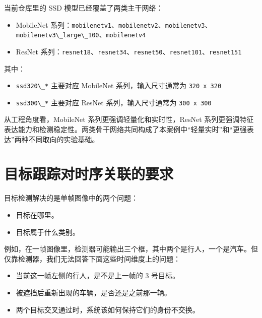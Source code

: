 当前仓库里的 SSD 模型已经覆盖了两类主干网络：

\begin{itemize}
\tightlist
\item
  MobileNet
  系列：\passthrough{\lstinline!mobilenetv1!}、\passthrough{\lstinline!mobilenetv2!}、\passthrough{\lstinline!mobilenetv3!}、\passthrough{\lstinline!mobilenetv3\_large\_100!}、\passthrough{\lstinline!mobilenetv4!}
\item
  ResNet
  系列：\passthrough{\lstinline!resnet18!}、\passthrough{\lstinline!resnet34!}、\passthrough{\lstinline!resnet50!}、\passthrough{\lstinline!resnet101!}、\passthrough{\lstinline!resnet151!}
\end{itemize}

其中：

\begin{itemize}
\tightlist
\item
  \passthrough{\lstinline!ssd320\_*!} 主要对应 MobileNet
  系列，输入尺寸通常为 \passthrough{\lstinline!320 x 320!}
\item
  \passthrough{\lstinline!ssd300\_*!} 主要对应 ResNet
  系列，输入尺寸通常为 \passthrough{\lstinline!300 x 300!}
\end{itemize}

从工程角度看，MobileNet 系列更强调轻量化和实时性，ResNet
系列更强调特征表达能力和检测稳定性。两类骨干网络共同构成了本案例中``轻量实时''和``更强表达''两种不同取向的实验基础。

\section{目标跟踪对时序关联的要求}\label{src-experiment-case2-h4}

目标检测解决的是单帧图像中的两个问题：

\begin{itemize}
\tightlist
\item
  目标在哪里。
\item
  目标属于什么类别。
\end{itemize}

例如，在一帧图像里，检测器可能输出三个框，其中两个是行人，一个是汽车。但仅靠检测器，我们无法回答下面这些时间维度上的问题：

\begin{itemize}
\tightlist
\item
  当前这一帧左侧的行人，是不是上一帧的 3 号目标。
\item
  被遮挡后重新出现的车辆，是否还是之前那一辆。
\item
  两个目标交叉通过时，系统该如何保持它们的身份不交换。
\end{itemize}

